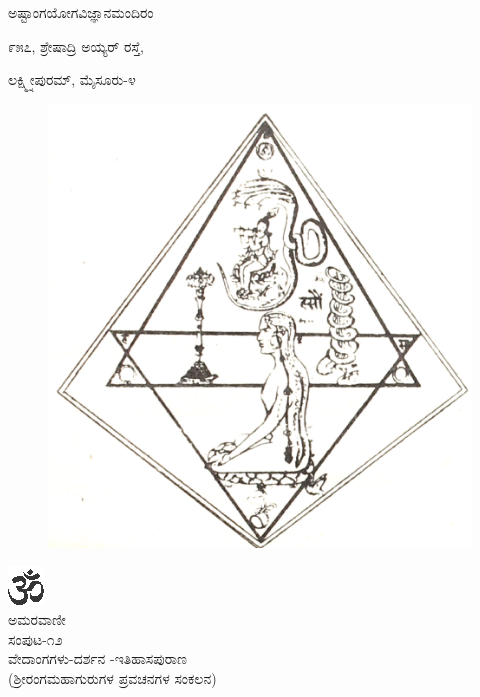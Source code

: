 \vskip -10pt

\begin{center}

{\large ಅಷ್ಟಾಂಗಯೋಗವಿಜ್ಞಾನಮಂದಿರಂ}

{\normalsize ೯೫೭, ಶ್ರೇಷಾದ್ರಿ ಅಯ್ಯರ್ ರಸ್ತೆ,}

{\normalsize ಲಕ್ಷ್ಮ್ನೀಪುರಮ್, ಮೈಸೂರು-೪}

\end{center}

\newpage

\begin{figure}[h]
\centering
{\includegraphics[scale=.18]{0000b.eps}}
\end{figure}

\begin{center}
{\includegraphics[scale=1.5]{om.eps}}\\[5pt]

{\large ಅಮರವಾಣೀ}\\[5pt]

{\normalsize ಸಂಪುಟ-೧೨}\\[5pt]

{\large ವೇದಾಂಗಗಳು-ದರ್ಶನ -ಇತಿಹಾಸಪುರಾಣ}\\[5pt]

{\normalsize (ಶ್ರೀರಂಗಮಹಾಗುರುಗಳ ಪ್ರವಚನಗಳ ಸಂಕಲನ)}
\end{center}

